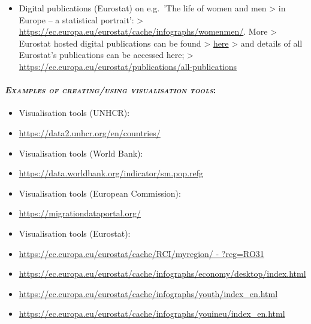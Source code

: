 \documentclass[
]{article}
\providecommand{\tightlist}{%
  \setlength{\itemsep}{0pt}\setlength{\parskip}{0pt}}
\begin{document}
\begin{itemize}
\tightlist
\item
  Digital publications (Eurostat) on e.g.~{'The life of women and men
  \textgreater{} in Europe -- a statistical portrait}':
  \textgreater{} \url{https://ec.europa.eu/eurostat/cache/infographs/womenmen/}. More
  \textgreater{} Eurostat hosted digital publications can be found
  \textgreater{} \href{https://ec.europa.eu/eurostat/publications/digital-publications?p_p_id=101_INSTANCE_lw69MeCcUVQY\&p_p_lifecycle=0\&p_p_state=normal\&p_p_mode=view\&p_p_col_id=column-2\&p_p_col_count=1\&_101_INSTANCE_lw69MeCcUVQY_delta=4\&_101_INSTANCE_lw69MeCcUVQY_keywords=\&_101_INSTANCE_lw69MeCcUVQY_advancedSearch=false\&_101_INSTANCE_lw69MeCcUVQY_andOperator=true\&p_r_p_564233524_resetCur=false\&_101_INSTANCE_lw69MeCcUVQY_cur=1}{here}
  \textgreater{} and details of all Eurostat's publications can be accessed here;
  \textgreater{} \url{https://ec.europa.eu/eurostat/publications/all-publications}
\end{itemize}

\hypertarget{examples-of-creatingusing-visualisation-tools}{%
\paragraph{\texorpdfstring{\emph{\textsc{Examples of creating/using visualisation tools}}:}{Examples of creating/using visualisation tools:}}\label{examples-of-creatingusing-visualisation-tools}}

\begin{itemize}
\item
  Visualisation tools (UNHCR):
\item
  \url{https://data2.unhcr.org/en/countries/}
\item
  Visualisation tools (World Bank):
\item
  \url{https://data.worldbank.org/indicator/sm.pop.refg}
\item
  Visualisation tools (European Commission):
\item
  \url{https://migrationdataportal.org/}
\item
  Visualisation tools (Eurostat):
\item
  \href{https://ec.europa.eu/eurostat/cache/RCI/myregion/\#?reg=RO31}{https://ec.europa.eu/eurostat/cache/RCI/myregion/ -
  ?reg=RO31}
\item
  \url{https://ec.europa.eu/eurostat/cache/infographs/economy/desktop/index.html}
\item
  \url{https://ec.europa.eu/eurostat/cache/infographs/youth/index_en.html}
\item
  \url{https://ec.europa.eu/eurostat/cache/infographs/youineu/index_en.html}
\end{itemize}
\end{document}
